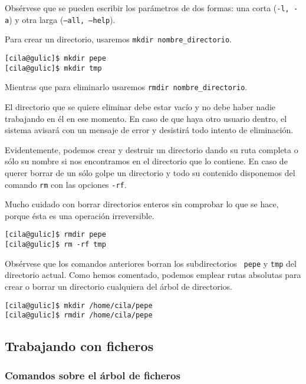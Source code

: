 Obsérvese que  se pueden  escribir los parámetros  de dos  formas: una
corta ({\tt -l, -a}) y otra larga ({\tt --all, --help}).

Para crear  un directorio, usaremos {\tt  mkdir nombre\_directorio}.

\begin{verbatim}
[cila@gulic]$ mkdir pepe
[cila@gulic]$ mkdir tmp
\end{verbatim}

Mientras que para eliminarlo  usaremos {\tt rmdir nombre\_directorio}.

\begin{nota}
El directorio que se quiere eliminar  debe estar vacío y no debe haber
nadie  trabajando en  él en  ese  momento. En  caso de  que haya  otro
usuario dentro, el sistema avisará con un mensaje de error y desistirá
todo intento de eliminación.
\end{nota}

Evidentemente, podemos  crear y destruir  un directorio dando  su ruta
completa o sólo  su nombre si nos encontramos en  el directorio que lo
contiene. En  caso de querer borrar  de un sólo golpe  un directorio y
todo su  contenido disponemos  del comando {\tt  rm} con  las opciones
{\tt  -rf}.

\begin{nota}
Mucho cuidado con  borrar directorios enteros sin comprobar  lo que se
hace, porque ésta es una operación irreversible.\\
\end{nota}

\begin{verbatim}
[cila@gulic]$ rmdir pepe
[cila@gulic]$ rm -rf tmp
\end{verbatim}

Obsérvese que los comandos  anteriores borran los subdirectorios {\tt
pepe} y {\tt tmp} del directorio actual. Como hemos comentado, podemos
emplear rutas absolutas  para crear o borrar  un directorio cualquiera
del árbol de directorios.

\begin{verbatim}
[cila@gulic]$ mkdir /home/cila/pepe
[cila@gulic]$ rmdir /home/cila/pepe
\end{verbatim}

\subsection{Trabajando con ficheros}

\subsubsection{Comandos sobre el árbol de ficheros}

